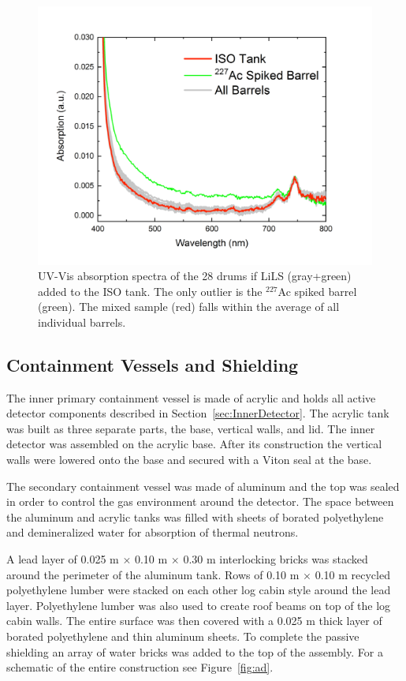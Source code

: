 \begin{figure}[h]
	\centering
	\includegraphics[width=0.6\linewidth]{tex/4-prospect-images/LiLS}
	\caption[LiLS UV-Vis absorption spectra]{UV-Vis absorption spectra of the 28 drums if LiLS (gray+green) added to the ISO tank. The only outlier is the $^{227}$Ac spiked barrel (green). The mixed sample (red) falls within the average of all individual barrels. \cite{LongNIM}}
	\label{fig:lils}
\end{figure}


\subsection{Containment Vessels and Shielding} \label{sec:shielding}

The inner primary containment vessel is made of acrylic and holds all active detector components described in Section~\ref{sec:InnerDetector}. 
The acrylic tank was built as three separate parts, the base, vertical walls, and lid. 
The inner detector was assembled on the acrylic base. After its construction the vertical walls were lowered onto the base and secured with a Viton seal at the base. 

The secondary containment vessel was made of aluminum and the top was sealed in order to control the gas environment around the detector.
The space between the aluminum and acrylic tanks was filled with sheets of borated polyethylene and demineralized water for absorption of thermal neutrons.

A lead layer of 0.025 m $\times$ 0.10 m $\times$ 0.30 m interlocking bricks was stacked around the perimeter of the aluminum tank. 
Rows of 0.10 m $\times$ 0.10 m recycled polyethylene lumber were stacked on each other log cabin style around the lead layer.
Polyethylene lumber was also used to create roof beams on top of the log cabin walls.
The entire surface was then covered with a 0.025 m thick layer of borated polyethylene and thin aluminum sheets. 
To complete the passive shielding an array of water bricks was added to the top of the assembly. 
For a schematic of the entire construction see Figure~\ref{fig:ad}.



